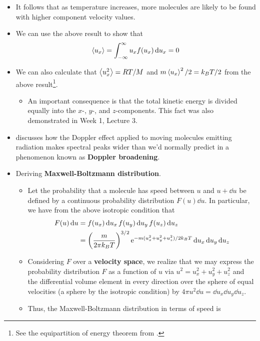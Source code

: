 \documentclass[../notes.tex]{subfiles}
\begin{document}
\begin{itemize}
\begin{itemize}
    \end{itemize}
    \item It follows that as temperature increases, more molecules are likely to be found with higher component velocity values.
    \item We can use the above result to show that
    \begin{equation*}
        \prb{u_x} = \int_{-\infty}^\infty u_xf(u_x)\dd{u_x} = 0
    \end{equation*}
    \item We can also calculate that $\prb{u_x^2}=RT/M$ and $m\prb{u_x}^2/2=k_BT/2$ from the above result\footnote{See the equipartition of energy theorem from \textcite{bib:PHYS13300Notes}.}.
    \begin{itemize}
        \item An important consequence is that the total kinetic energy is divided equally into the $x$-, $y$-, and $z$-components. This fact was also demonstrated in Week 1, Lecture 3.
    \end{itemize}
    \item \textcite{bib:McQuarrieSimon} discusses how the Doppler effect applied to moving molecules emitting radiation makes spectral peaks wider than we'd normally predict in a phenomenon known as \textbf{Doppler broadening}.
    \item Deriving \textbf{Maxwell-Boltzmann distribution}.
    \begin{itemize}
        \item Let the probability that a molecule has speed between $u$ and $u+\dd{u}$ be defined by a continuous probability distribution $F(u)\dd{u}$. In particular, we have from the above isotropic condition that
        \begin{align*}
            F(u)\dd{u} &= f(u_x)\dd{u_x}f(u_y)\dd{u_y}f(u_z)\dd{u_z}\\
            &= \left( \frac{m}{2\pi k_BT} \right)^{3/2}\e[-m(u_x^2+u_y^2+u_z^2)/2k_BT]\dd{u_x}\dd{u_y}\dd{u_z}
        \end{align*}
        \item Considering $F$ over a \textbf{velocity space}, we realize that we may express the probability distribution $F$ as a function of $u$ via $u^2=u_x^2+u_y^2+u_z^2$ and the differential volume element in every direction over the sphere of equal velocities (a sphere by the isotropic condition) by $4\pi u^2\dd{u}=\dd{u_x}\dd{u_y}\dd{u_z}$.
        \item Thus, the Maxwell-Boltzmann distribution in terms of speed is

\end{itemize}
\end{itemize}
\end{document}
